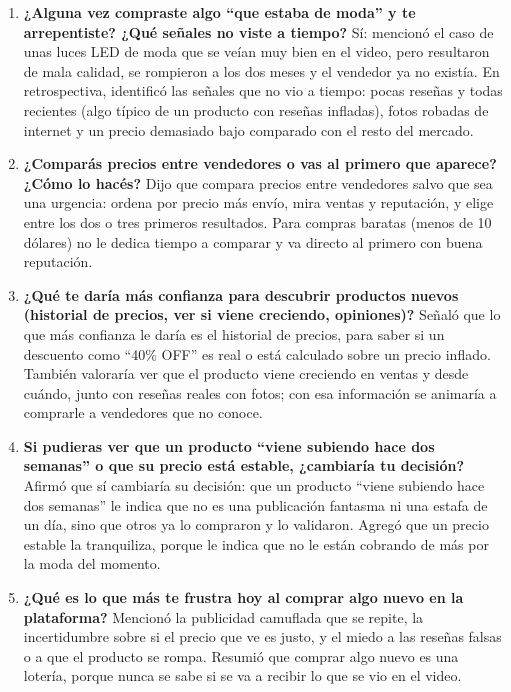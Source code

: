 \begin{enumerate}
	\item \textbf{¿Alguna vez compraste algo ``que estaba de moda'' y te arrepentiste? ¿Qué señales no viste a tiempo?} Sí: mencionó el caso de unas luces LED de moda que se veían muy bien en el video, pero resultaron de mala calidad, se rompieron a los dos meses y el vendedor ya no existía. En retrospectiva, identificó las señales que no vio a tiempo: pocas reseñas y todas recientes (algo típico de un producto con reseñas infladas), fotos robadas de internet y un precio demasiado bajo comparado con el resto del mercado.
	\item \textbf{¿Comparás precios entre vendedores o vas al primero que aparece? ¿Cómo lo hacés?} Dijo que compara precios entre vendedores salvo que sea una urgencia: ordena por precio más envío, mira ventas y reputación, y elige entre los dos o tres primeros resultados. Para compras baratas (menos de 10 dólares) no le dedica tiempo a comparar y va directo al primero con buena reputación.
	\item \textbf{¿Qué te daría más confianza para descubrir productos nuevos (historial de precios, ver si viene creciendo, opiniones)?} Señaló que lo que más confianza le daría es el historial de precios, para saber si un descuento como ``40\% OFF'' es real o está calculado sobre un precio inflado. También valoraría ver que el producto viene creciendo en ventas y desde cuándo, junto con reseñas reales con fotos; con esa información se animaría a comprarle a vendedores que no conoce.
	\item \textbf{Si pudieras ver que un producto ``viene subiendo hace dos semanas'' o que su precio está estable, ¿cambiaría tu decisión?} Afirmó que sí cambiaría su decisión: que un producto ``viene subiendo hace dos semanas'' le indica que no es una publicación fantasma ni una estafa de un día, sino que otros ya lo compraron y lo validaron. Agregó que un precio estable la tranquiliza, porque le indica que no le están cobrando de más por la moda del momento.
	\item \textbf{¿Qué es lo que más te frustra hoy al comprar algo nuevo en la plataforma?} Mencionó la publicidad camuflada que se repite, la incertidumbre sobre si el precio que ve es justo, y el miedo a las reseñas falsas o a que el producto se rompa. Resumió que comprar algo nuevo es una lotería, porque nunca se sabe si se va a recibir lo que se vio en el video.
\end{enumerate}
